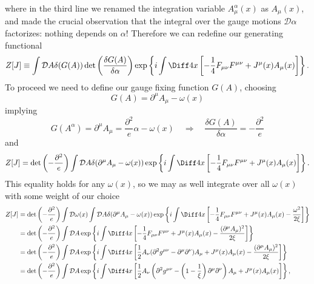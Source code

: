 where in the third line we renamed the integration variable $A^\alpha_\mu(x)$ as $A_\mu(x)$, and made the crucial observation that the integral over the gauge motions $\mathcal{D}\alpha$ factorizes: nothing depends on $\alpha$! Therefore we can redefine our generating functional
\begin{equation}
	Z[J] \equiv  \int\mathcal{D}A\delta(G(A)) \det\left(\frac{\delta G(A)}{\delta\alpha}\right) \exp\left\{i\int\Diff4x\left[-\frac{1}{4}F_{\mu\nu}F^{\mu\nu} + J^\mu(x)A_\mu(x)\right]\right\}.
\end{equation}
To proceed we need to define our gauge fixing function $G(A)$, choosing
\begin{equation}
	G(A) = \partial^\mu A_\mu - \omega(x)
\end{equation}
implying
\begin{equation}
	G(A^\alpha) = \partial^\mu A_\mu = \frac{\partial^2}{e}\alpha - \omega(x) \quad \Rightarrow \quad \frac{\delta G(A)}{\delta \alpha} = -\frac{\partial^2}{e}
\end{equation}
and
\begin{equation}
	Z[J] = \det\left(-\frac{\partial^2}{e}\right) \int \mathcal{D}A \delta(\partial^\mu A_\mu - \omega(x) ) \exp \left\{i \int \Diff4x \left[ - \frac{1}{4} F_{\mu\nu}F^{\mu\nu} + J^\mu(x) A_\mu(x) \right]\right\}.
\end{equation}
This equality holds for any $\omega(x)$, so we may as well integrate over all $\omega(x)$ with some weight of our choice 
\begin{align}
	Z[J] &= \det\left(-\frac{\partial^2}{e}\right) \int\mathcal{D}\omega(x) \int \mathcal{D}A \delta(\partial^\mu A_\mu - \omega(x) ) \exp \left\{i \int \Diff4x \left[ - \frac{1}{4} F_{\mu\nu}F^{\mu\nu} + J^\mu(x) A_\mu(x) - \frac{\omega^2}{2\xi} \right]\right\} \\
	&= \det\left(-\frac{\partial^2}{e}\right) \int \mathcal{D}A  \exp \left\{i \int \Diff4x \left[ - \frac{1}{4} F_{\mu\nu}F^{\mu\nu} + J^\mu(x) A_\mu(x) - \frac{(\partial^\mu A_\mu)^2}{2\xi} \right]\right\} \\
	&= \det\left(-\frac{\partial^2}{e}\right) \int \mathcal{D} A \exp \left\{ i\int\Diff4x \left[\frac{1}{2} A_\nu (\partial^2 g^{\mu\nu} - \partial^\mu\partial^\nu) A_\mu + J^\mu(x) A_\mu(x) - \frac{(\partial^\mu A_\mu)^2}{2 \xi} \right] \right\} \\
	&= \det\left(-\frac{\partial^2}{e}\right) \int \mathcal{D}A \exp\left\{i \int\Diff4x \left[\frac{1}{2} A_\nu \left(\partial^2 g^{\mu\nu} - \left(1-\frac{1}{\xi}\right)\partial^\mu\partial^\nu\right) A_\mu + J^\mu(x) A_\mu(x) \right] \right\},  
\end{align}
